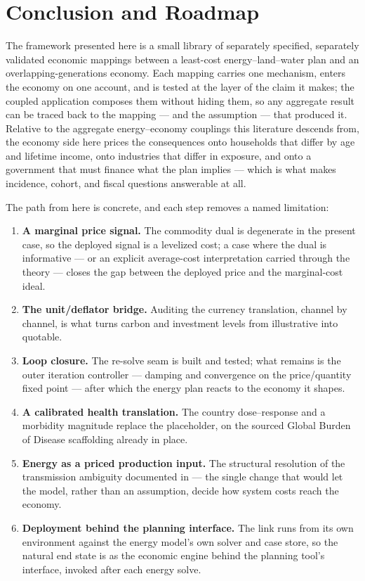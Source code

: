 \section{Conclusion and Roadmap}
\label{sec:conclusion}

The framework presented here is a small library of separately specified, separately
validated economic mappings between a least-cost energy--land--water plan and an
overlapping-generations economy. Each mapping carries one mechanism, enters the economy
on one account, and is tested at the layer of the claim it makes; the coupled
application composes them without hiding them, so any aggregate result can be traced
back to the mapping --- and the assumption --- that produced it. Relative to the
aggregate energy--economy couplings this literature descends from, the economy side
here prices the consequences onto households that differ by age and lifetime income,
onto industries that differ in exposure, and onto a government that must finance what
the plan implies --- which is what makes incidence, cohort, and fiscal questions
answerable at all.

The path from here is concrete, and each step removes a named limitation:
\begin{enumerate}
\item \textbf{A marginal price signal.} The commodity dual is degenerate in the
  present case, so the deployed signal is a levelized cost; a case where the dual is
  informative --- or an explicit average-cost interpretation carried through the
  theory --- closes the gap between the deployed price and the marginal-cost ideal.
\item \textbf{The unit/deflator bridge.} Auditing the currency translation, channel by
  channel, is what turns carbon and investment levels from illustrative into
  quotable.
\item \textbf{Loop closure.} The re-solve seam is built and tested; what remains is
  the outer iteration controller --- damping and convergence on the price/quantity
  fixed point --- after which the energy plan reacts to the economy it shapes.
\item \textbf{A calibrated health translation.} The country dose--response and a
  morbidity magnitude replace the placeholder, on the sourced Global Burden of
  Disease scaffolding already in place.
\item \textbf{Energy as a priced production input.} The structural resolution of the
  transmission ambiguity documented in  --- the single change
  that would let the model, rather than an assumption, decide how system costs reach
  the economy.
\item \textbf{Deployment behind the planning interface.} The link runs from its own
  environment against the energy model's own solver and case store, so the natural
  end state is as the economic engine behind the planning tool's interface, invoked
  after each energy solve.
\end{enumerate}
